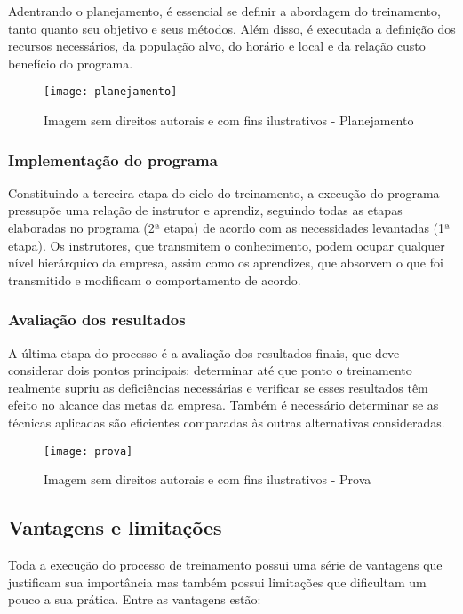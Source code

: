 \documentclass[12pt]{article}
\begin{document}
Adentrando o planejamento, é essencial se definir a abordagem do treinamento, tanto quanto seu objetivo e seus métodos. Além disso, é executada a definição dos recursos necessários, da população alvo, do horário e local e da relação custo benefício do programa.

\begin{figure}[h]
	\centering
	\texttt{[image: planejamento]}
	\caption{Imagem sem direitos autorais e com fins ilustrativos - Planejamento}
	\label{fig:mesh1}
\end{figure}

\subsubsection{Implementação do programa}

Constituindo a terceira etapa do ciclo do treinamento, a execução do programa pressupõe uma relação de instrutor e aprendiz, seguindo todas as etapas elaboradas no programa (2ª etapa) de acordo com as necessidades levantadas (1ª etapa). Os instrutores, que transmitem o conhecimento, podem ocupar qualquer nível hierárquico da empresa, assim como os aprendizes, que absorvem o que foi transmitido e modificam o comportamento de acordo.

\subsubsection{Avaliação dos resultados}

A última etapa do processo é a avaliação dos resultados finais, que deve considerar dois pontos principais: determinar até que ponto o treinamento realmente supriu as deficiências necessárias e verificar se esses resultados têm efeito no alcance das metas da empresa. Também é necessário determinar se as técnicas aplicadas são eficientes comparadas às outras alternativas consideradas.

\begin{figure}[h]
	\centering
	\texttt{[image: prova]}
	\caption{Imagem sem direitos autorais e com fins ilustrativos - Prova}
	\label{fig:mesh1}
\end{figure}

\subsection{Vantagens e limitações}

Toda a execução do processo de treinamento possui uma série de vantagens que justificam sua importância mas também possui limitações que dificultam um pouco a sua prática. 
Entre as vantagens estão:
\end{document}
